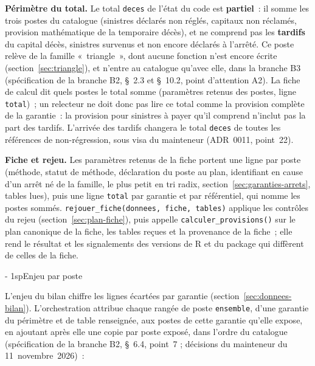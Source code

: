 \documentclass[a4paper,11pt]{article}
\makeatletter
\newcommand{\titrebandeau}[1]{%
  \noindent{\color{financeblue}\rule{\linewidth}{2.5pt}}
  \par\vspace{5mm}
  {\color{greenline}\raggedright\fontsize{19}{23}\bfseries\selectfont #1\par}
  \vspace{6mm}}
\newcommand{\charte@bandeau}[1]{%
  \parindent\z@ \everypar{\strut}%
  {\strut\par}\nobreak
  \titrebandeau{#1}\nobreak
  \kern\z@\nobreak\strut\par}
\newcommand{\charte@reserve}[1]{\par\ifinner\else\if@nobreak\else
  \penalty\z@ %
  \begingroup\setlength{\dimen@}{#1}%
  \dimen@ii\pagegoal \advance\dimen@ii-\pagetotal
  \ifdim\pagegoal=\maxdimen\else\ifdim\dimen@>\dimen@ii
    \vfil\penalty-\@M %
  \fi\fi\endgroup\fi\fi}
\renewcommand{\section}{\charte@reserve{12\baselineskip}%
  \@startsection{section}{1}{\z@}%
  {\z@}{1sp}{\normalfont\charte@bandeau}}
\newcommand{\code}[1]{\texttt{\small #1}}
\makeatother
\begin{document}
\textbf{Périmètre du total.} Le total \code{deces} de l'état du code est
\textbf{partiel}~: il somme les trois postes du catalogue (sinistres
déclarés non réglés, capitaux non réclamés, provision mathématique de la
temporaire décès), et ne comprend pas les \textbf{tardifs} du capital
décès, sinistres survenus et non encore déclarés à l'arrêté. Ce poste
relève de la famille «~triangle~», dont aucune fonction n'est encore écrite
(section~\ref{sec:triangle}), et n'entre au catalogue qu'avec elle, dans la
branche B3 (spécification de la branche B2, §~2.3 et §~10.2, point
d'attention A2). La fiche de calcul dit quels
postes le total somme (paramètres retenus des postes, ligne \code{total})~;
un relecteur ne doit donc pas lire ce total comme la provision complète
de la garantie~: la provision pour sinistres à payer qu'il comprend
n'inclut pas la part des tardifs. L'arrivée des tardifs changera
le total \code{deces} de toutes les références de non-régression, sous visa
du mainteneur (ADR~0011, point~22).

\textbf{Fiche et rejeu.} Les paramètres retenus de la fiche portent une
ligne par poste (méthode, statut de méthode, déclaration du poste au plan,
identifiant en cause d'un arrêt né de la famille, le plus petit en tri
radix, section~\ref{sec:garanties-arrets}, tables
lues),
puis une ligne \code{total} par garantie et par référentiel, qui nomme les
postes sommés. \code{rejouer\_fiche(donnees, fiche, tables)} applique les
contrôles du rejeu (section~\ref{sec:plan-fiche}), puis appelle
\code{calculer\_provisions()} sur le plan canonique de la fiche, les tables
reçues et la provenance de la fiche~; elle rend le résultat et les
signalements des versions de R et du package qui diffèrent de celles de la
fiche.

\section{Enjeu par poste}
\label{sec:enjeu}

L'enjeu du bilan chiffre les lignes écartées par garantie
(section~\ref{sec:donnees-bilan}). L'orchestration attribue chaque rangée de
poste \code{ensemble}, d'une garantie du périmètre et de table renseignée,
aux postes de cette garantie qu'elle expose, en ajoutant après elle une copie
par poste exposé, dans l'ordre du catalogue (spécification de la branche
B2, §~6.4, point~7 ; décisions du mainteneur du 11~novembre~2026)~:
\end{document}
